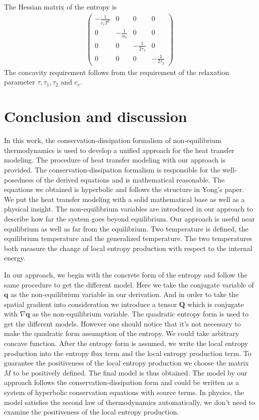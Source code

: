 \documentclass[a4paper]{article}
\begin{document}
The Hessian matrix of the entropy is 
\begin{eqnarray}
\left(\begin{array}{llll}  -\frac{1}{c_v T^2} & 0 & 0 & 0 \\
                                           0  & -\frac{1}{\alpha_0} & 0 & 0 \\
										   0 & 0 & -\frac{1}{2\tau_1} & 0 \\
										   0 & 0 & 0 & -\frac{1}{2\tau_2}
										   \end{array} \right)
\end{eqnarray}
The concavity requirement follows from the requirement of the relaxation parameter $\tau,\tau_1,\tau_2$ and $c_v$.

\section{Conclusion and discussion}
In this work, the conservation-dissipation formalism of non-equilibrium thermodynamics is used to develop a unified approach for the heat transfer modeling. The procedure of heat transfer modeling with our approach is provided. The conservation-dissipation formalism is responsible for the well-posedness of the derived equations and is mathematical reasonable. The equations we obtained is hyperbolic and follows the structure in Yong's paper.\cite{yong2008interesting} We put the heat transfer modeling with a solid mathematical base as well as a physical insight. The non-equilibrium variables are introduced in our approach to describe how far the system goes beyond equilibrium. Our approach is useful near equilibrium as well as far from the equilibrium. Two temperature is defined, the equilibrium temperature and the generalized temperature. The two temperatures both measure the change of local entropy production with respect to the internal energy. 

In our approach, we begin with the concrete form of the entropy and follow the same procedure to get the different model. Here we take the conjugate variable of $\mathbf{q}$ as the non-equilibrium variable in our derivation. And in order to take the spatial gradient into consideration we introduce a tensor $\mathbf{Q}$ which is conjugate with $\nabla \mathbf{q}$ as the non-equilibrium variable. The quadratic entropy form is used to get the different models. However one should notice that it's not necessary to make the quadratic form assumption of the entropy. We could take arbitrary concave function. After the entropy form is assumed, we write the local entropy production into the entropy flux term and the local entropy production term. To guarantee the positiveness of the local entropy production we choose the matrix $M$ to be positively defined. The final model is thus obtained. The model by our approach follows the conservation-dissipation form and could be written as a system of hyperbolic conservation equations with source terms. In physics, the model satisfies the second law of thermodynamics automatically, we don't need to examine the positiveness of the local entropy production.
\end{document}
